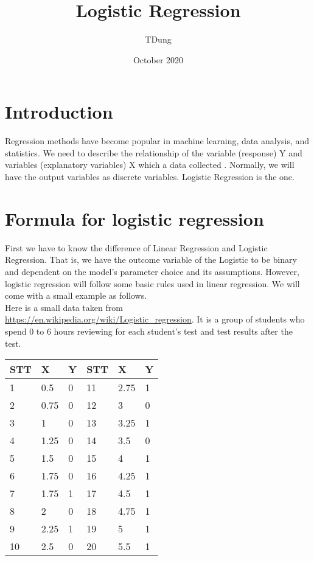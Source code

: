 \documentclass{article}
\title{Logistic Regression}
\author{TDung}
\date{October 2020}
\begin{document}
\maketitle  

\section{Introduction}
    Regression methods have become popular in machine learning, data analysis, and statistics. We need to describe the relationship of the variable (response) Y and variables (explanatory variables) X which a data collected . Normally, we will have the output variables as discrete variables. Logistic Regression is the one.
\section{Formula for logistic regression} 
    First we have to know the difference of Linear Regression and Logistic Regression. That is, we have the outcome variable of the Logistic to be binary and dependent on the model's parameter choice and its assumptions. However, logistic regression will follow some basic rules used in linear regression. We will come with a small example as follows.
    \\
    Here is a small data taken from \url{https://en.wikipedia.org/wiki/Logistic_regression}. It is a group of students who spend 0 to 6 hours reviewing for each student's test and test results after the test.
    \\
    \begin{center} 
        \begin{tabular}{|l|l|l|l|l|l|}
        \hline
        STT & X    & Y          & STT & X    & Y \\ \hline
        1   & 0.5  & 0          & 11  & 2.75 & 1 \\ \hline
        2   & 0.75 & 0          & 12  & 3    & 0 \\ \hline
        3   & 1    & 0          & 13  & 3.25 & 1 \\ \hline
        4   & 1.25 & 0          & 14  & 3.5  & 0 \\ \hline
        5   & 1.5  & 0          & 15  & 4    & 1 \\ \hline
        6   & 1.75 & 0          & 16  & 4.25 & 1 \\ \hline
        7   & 1.75 & 1          & 17  & 4.5  & 1 \\ \hline
        8   & 2    & 0          & 18  & 4.75 & 1 \\ \hline
        9   & 2.25 & 1          & 19  & 5    & 1 \\ \hline
        10  & 2.5  & 0          & 20  & 5.5  & 1 \\ \hline
        \end{tabular}
    \end{center}
\end{document}
